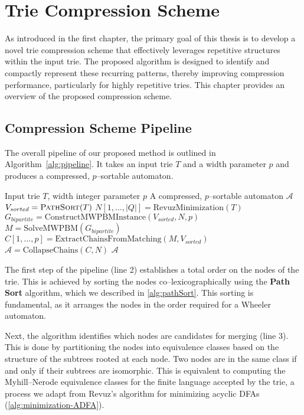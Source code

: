 \chapter{Trie Compression Scheme} \label{chp:project_overview}
As introduced in the first chapter, the primary goal of this thesis is to develop a novel trie compression scheme that effectively leverages repetitive structures within the input trie. The proposed algorithm is designed to identify and compactly represent these recurring patterns, thereby improving compression performance, particularly for highly repetitive tries. This chapter provides an overview of the proposed compression scheme.

\section{Compression Scheme Pipeline}
The overall pipeline of our proposed method is outlined in Algorithm~\ref{alg:pipeline}. It takes an input trie $T$ and a width parameter $p$ and produces a compressed, $p$--sortable automaton.
\begin{algorithm}[H]
\caption{$\textsc{CompressTrie}(T,p)$}
\label{alg:pipeline}
\begin{algorithmic}[1]
\Require Input trie $T$, width integer parameter $p$
\Ensure A compressed, $p$--sortable automaton $\mathcal{A}$
    \State $V_{sorted} = \textsc{PathSort}(T)$ 
    \State $N[1,\dots,|Q|] = \text{RevuzMinimization}(T)$
    \State $G_{bipartite} = \text{ConstructMWPBMInstance}(V_{sorted}, N, p)$
    \State $M = \text{SolveMWPBM}(G_{bipartite})$ 
    \State $C[1,\dots,p] = \text{ExtractChainsFromMatching}(M, V_{sorted})$ 
    \State $\mathcal{A} = \text{CollapseChains}(C, N)$ 
    \State \Return $\mathcal{A}$
\end{algorithmic}
\end{algorithm}

The first step of the pipeline (line 2) establishes a total order on the nodes of the trie. This is achieved by sorting the nodes co--lexicographically using the \textbf{Path Sort} algorithm, which we described in \cref{alg:pathSort}. This sorting is fundamental, as it arranges the nodes in the order required for a Wheeler automaton.

Next, the algorithm identifies which nodes are candidates for merging (line 3). This is done by partitioning the nodes into equivalence classes based on the structure of the subtrees rooted at each node. Two nodes are in the same class if and only if their subtrees are isomorphic. This is equivalent to computing the Myhill--Nerode equivalence classes for the finite language accepted by the trie, a process we adapt from Revuz's algorithm for minimizing acyclic DFAs (\cref{alg:minimization-ADFA}).

